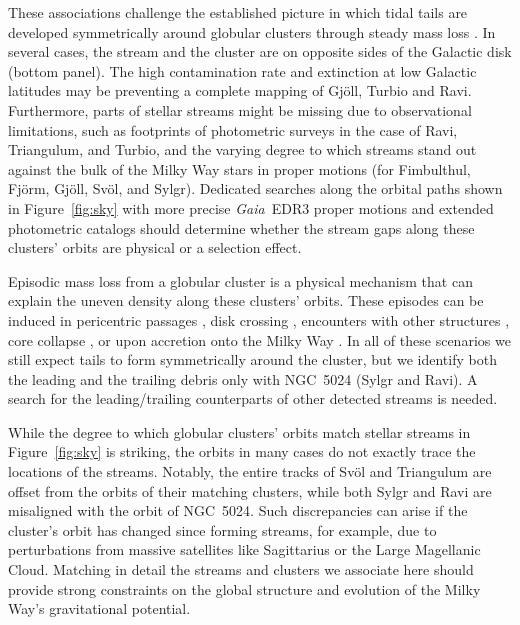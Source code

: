 \documentclass[twocolumn]{aastex63}
\newcommand{\gaia}{\textsl{Gaia}}
\begin{document}
These associations challenge the established picture in which tidal tails are developed symmetrically around globular clusters through steady mass loss \citep[e.g.,][]{kuepper2010}.
In several cases, the stream and the cluster are on opposite sides of the Galactic disk (bottom panel).
The high contamination rate and extinction at low Galactic latitudes may be preventing a complete mapping of Gj\" oll, Turbio and Ravi.
Furthermore, parts of stellar streams might be missing due to observational limitations, such as footprints of photometric surveys in the case of Ravi, Triangulum, and Turbio, and the varying degree to which streams stand out against the bulk of the Milky Way stars in proper motions (for Fimbulthul, Fj\" orm, Gj\" oll, Sv\" ol, and Sylgr).
Dedicated searches along the orbital paths shown in Figure~\ref{fig:sky} with more precise \gaia\ EDR3 proper motions \citep{gaiaedr3} and extended photometric catalogs \citep{dey2019} should determine whether the stream gaps along these clusters' orbits are physical or a selection effect.

Episodic mass loss from a globular cluster is a physical mechanism that can explain the uneven density along these clusters' orbits.
These episodes can be induced in pericentric passages \citep{general_stripping_ref}, disk crossing \citep{dehnen2004}, encounters with other structures \citep{?}, core collapse \citep{?}, or upon accretion onto the Milky Way \citep{?}.
In all of these scenarios we still expect tails to form symmetrically around the cluster, but we identify both the leading and the trailing debris only with NGC~5024 (Sylgr and Ravi).
A search for the leading/trailing counterparts of other detected streams is needed.

While the degree to which globular clusters' orbits match stellar streams in Figure~\ref{fig:sky} is striking, the orbits in many cases do not exactly trace the locations of the streams.
Notably, the entire tracks of Sv\" ol and Triangulum are offset from the orbits of their matching clusters, while both Sylgr and Ravi are misaligned with the orbit of NGC~5024.
Such discrepancies can arise if the cluster's orbit has changed since forming streams, for example, due to perturbations from massive satellites like Sagittarius or the Large Magellanic Cloud.
Matching in detail the streams and clusters we associate here should provide strong constraints on the global structure and evolution of the Milky Way's gravitational potential.
\end{document}
